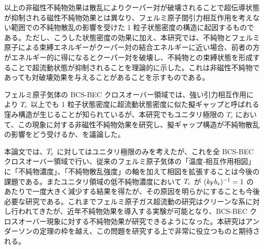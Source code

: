 以上の非磁性不純物効果は散乱によりクーパー対が破壊されることで超伝導状態が抑制される磁性不純物効果とは異なり、フェルミ原子間引力相互作用を考えない範囲での不純物散乱の影響を受けた 1 粒子状態密度の構造に起因するものである。ただし、こうした状態密度の効果に加え、本研究では、不純物とフェルミ原子による束縛エネルギーがクーパー対の結合エネルギーに近い場合、前者の方がエネルギー的に得になるとクーパー対を破壊し、不純物との束縛状態を形成することで超流動状態が抑制されることを理論的に示した。これは非磁性不純物であっても対破壊効果を与えることがあることを示すものである。

フェルミ原子気体の BCS-BEC クロスオーバー領域では、強い引力相互作用により $T_{\text{c}}$ 以上でも 1 粒子状態密度に超流動状態密度に似た擬ギャップと呼ばれる窪み構造が生じることが知られているが、本研究でもユニタリ極限の $T_c$ において、この現象に対する非磁性不純物効果を研究し、擬ギャップ構造が不純物散乱の影響をどう受けるか、を議論した。

本論文では、$T_{\text{c}}$ に対してはユニタリ極限のみを考えたが、これを全 BCS-BEC クロスオーバー領域で行い、従来のフェルミ原子気体の「温度-相互作用相図」に「不純物濃度」、「不純物散乱強度」の軸を加えて相図を拡張することは今後の課題である。またユニタリ領域の低不純物濃度において $T_{\text{c}}$ が $(k_{\text{F}} b_s)^{-1}=1$ のあたりで一度大きく減少する結果を得たが、その原因を明らかにすることも今後必要な研究である。これまでフェルミ原子ガス超流動の研究はクリーンな系に対し行われてきたが、近年不純物効果を導入する実験が可能となり、BCS-BEC クロスオーバー現象に対する不純物効果が研究できるようになった。本研究はアンダーソンの定理の枠を越え、この問題を研究する上で非常に役立つものと期待される。


